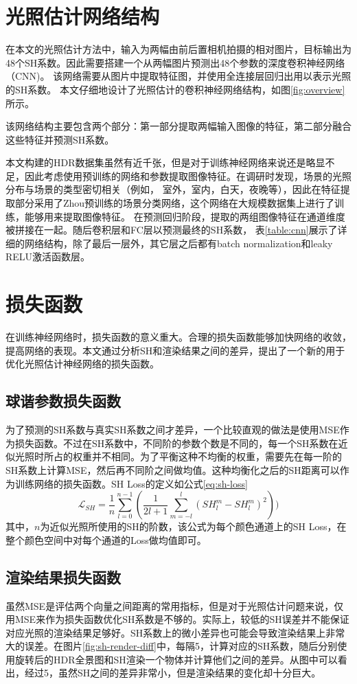 \section{光照估计网络结构}
在本文的光照估计方法中，输入为两幅由前后置相机拍摄的相对图片，目标输出为48个SH系数。因此需要搭建一个从两幅图片预测出48个参数的深度卷积神经网络（CNN)。
该网络需要从图片中提取特征图，并使用全连接层回归出用以表示光照的SH系数。
本文仔细地设计了光照估计的卷积神经网络结构，如图\ref{fig:overview}所示。


该网络结构主要包含两个部分：第一部分提取两幅输入图像的特征，第二部分融合这些特征并预测SH系数。 

本文构建的HDR数据集虽然有近千张，但是对于训练神经网络来说还是略显不足，因此考虑使用预训练的网络和参数提取图像特征。在调研时发现，场景的光照分布与场景的类型密切相关（例如， 室外，室内，白天，夜晚等），因此在特征提取部分采用了Zhou预训练的场景分类网络\cite{zhou2017places}，这个网络在大规模数据集上进行了训练，能够用来提取图像特征。 在预测回归阶段，提取的两组图像特征在通道维度被拼接在一起。随后卷积层和FC层以预测最终的SH系数， 表\ref{table:cnn}展示了详细的网络结构，除了最后一层外，其它层之后都有batch normalization和leaky RELU激活函数层。


\section{损失函数}
在训练神经网络时，损失函数的意义重大。合理的损失函数能够加快网络的收敛，提高网络的表现。本文通过分析SH和渲染结果之间的差异，提出了一个新的用于优化光照估计神经网络的损失函数。
\subsection{球谐参数损失函数} 为了预测的SH系数与真实SH系数之间才差异，一个比较直观的做法是使用MSE作为损失函数。不过在SH系数中，不同阶的参数个数是不同的，每一个SH系数在近似光照时所占的权重并不相同。为了平衡这种不均衡的权重，需要先在每一阶的SH系数上计算MSE，然后再不同阶之间做均值。这种均衡化之后的SH距离可以作为训练网络的损失函数。SH Loss的定义如公式\ref{eq:sh-loss}
\begin{equation}
    \mathcal{L}_{SH} = \frac{1}{n}\sum_{l=0}^{n-1}(\frac{1}{2l+1}\sum_{m=-l}^{l}(SH^m_l - SH^m_l)^2))
    \label{eq:sh-loss}
\end{equation}
其中，$n$为近似光照所使用的SH的阶数，该公式为每个颜色通道上的SH Loss，在整个颜色空间中对每个通道的Loss做均值即可。

\subsection{渲染结果损失函数} 虽然MSE是评估两个向量之间距离的常用指标，但是对于光照估计问题来说，仅用MSE来作为损失函数优化SH系数是不够的。实际上，较低的SH误差并不能保证对应光照的渲染结果足够好。SH系数上的微小差异也可能会导致渲染结果上非常大的误差。在图片\ref{fig:sh-render-diff}中，每隔5，计算对应的SH系数，随后分别使用旋转后的HDR全景图和SH渲染一个物体并计算他们之间的差异。从图中可以看出，经过5，虽然SH之间的差异非常小，但是渲染结果的变化却十分巨大。



